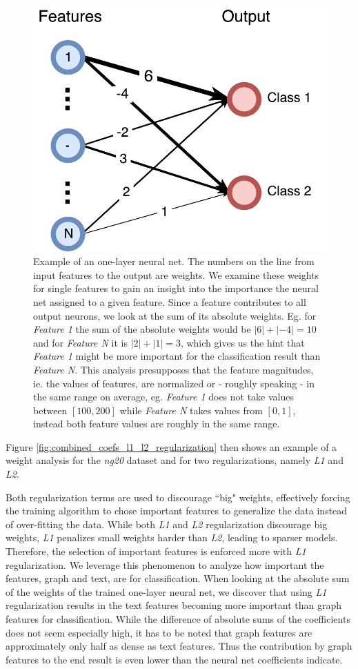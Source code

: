 \begin{figure}[htb!]
	\centering
	{\includegraphics[width=0.5\linewidth]{assets/figures/coefs_example.pdf}%
		\caption[Example: One-layer neural net]{%
			Example of an one-layer neural net. The numbers on the line from input features to the output are weights.
			We examine these weights for single features to gain an insight into the importance the neural net assigned to a given feature. Since a feature contributes to all output neurons, we look at the sum of its absolute weights. Eg. for \textit{Feature 1} the sum of the absolute weights would be $|6| + |-4| = 10$ and for \textit{Feature N} it is $|2| + |1| = 3$, which gives us the hint that \textit{Feature 1} might be more important for the classification result than \textit{Feature N}.
			This analysis presupposes that the feature magnitudes, ie. the values of features, are normalized or - roughly speaking - in the same range on average, eg. \textit{Feature 1} does not take values between $[100, 200]$ while \textit{Feature N} takes values from $[0, 1]$, instead both feature values are roughly in the same range.
		}%
		\label{fig:coefs_example_one_layer}}
\end{figure}

Figure \ref{fig:combined_coefs_l1_l2_regularization} then shows an example of a weight analysis for the \textit{ng20} dataset and for two regularizations, namely \textit{L1} and \textit{L2}.

Both regularization terms are used to discourage ``big" weights, effectively forcing the training algorithm to chose important features to generalize the data instead of over-fitting the data.
While both \textit{L1} and \textit{L2} regularization discourage big weights, \textit{L1} penalizes small weights harder than \textit{L2}, leading to sparser models.
Therefore, the selection of important features is enforced more with \textit{L1} regularization.
We leverage this phenomenon to analyze how important the features, graph and text, are for classification.
When looking at the absolute sum of the weights of the trained one-layer neural net, we discover that using \textit{L1} regularization results in the text features becoming more important than graph features for classification.
While the difference of absolute sums of the coefficients does not seem especially high, it has to be noted that graph features are approximately only half as dense as text features.
Thus the contribution by graph features to the end result is even lower than the neural net coefficients indicate.

